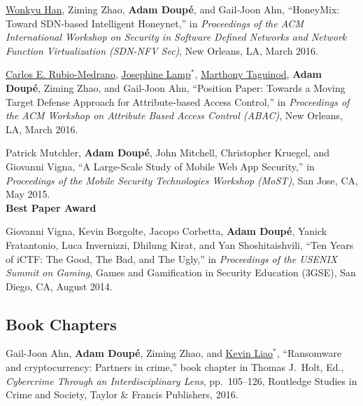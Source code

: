 \documentclass[11pt,letterpaper,sans]{moderncv}
\begin{document}
\begin{etaremune}
\item \underline{Wonkyu Han}, Ziming Zhao, \textbf{Adam Doup\'e}, and
  Gail-Joon Ahn, ``HoneyMix: Toward SDN-based Intelligent Honeynet,''
  in \emph{Proceedings of the ACM International Workshop on Security
    in Software Defined Networks and Network Function Virtualization
    (SDN-NFV Sec)}, New Orleans, LA, March 2016.

\item \underline{Carlos E. Rubio-Medrano}, \underline{Josephine
  Lamp}$^*$, \underline{Marthony Taguinod}, \textbf{Adam Doup\'e},
  Ziming Zhao, and Gail-Joon Ahn, ``Position Paper: Towards a Moving
  Target Defense Approach for Attribute-based Access Control,'' in
  \emph{Proceedings of the ACM Workshop on Attribute Based Access
    Control (ABAC)}, New Orleans, LA, March 2016.

\item Patrick Mutchler, \textbf{Adam Doup\'e}, John Mitchell,
  Christopher Kruegel, and Giovanni Vigna, ``A Large-Scale Study of
  Mobile Web App Security,'' in \emph{Proceedings of the Mobile
    Security Technologies Workshop (MoST)}, San Jose, CA, May 2015. \\
  \textbf{Best Paper Award}

\item Giovanni Vigna, Kevin Borgolte, Jacopo Corbetta, \textbf{Adam
  Doup\'e}, Yanick Fratantonio, Luca Invernizzi, Dhilung Kirat, and
  Yan Shoshitaishvili, ``Ten Years of iCTF: The Good, The Bad, and The
  Ugly,'' in \emph{Proceedings of the USENIX Summit on Gaming}, Games
  and Gamification in Security Education (3GSE), San Diego, CA, August
  2014.

\end{etaremune}

\subsection{Book Chapters}

\begin{etaremune}

\item Gail-Joon Ahn, \textbf{Adam Doup\'e}, Ziming Zhao, and
  \underline{Kevin Liao}$^*$, ``Ransomware and cryptocurrency: Partners in
  crime,'' book chapter in Thomas J.\ Holt, Ed., \emph{Cybercrime
    Through an Interdisciplinary Lens}, pp.\ 105--126, Routledge
  Studies in Crime and Society, Taylor \& Francis Publishers, 2016.
  
\end{etaremune}
\end{document}
